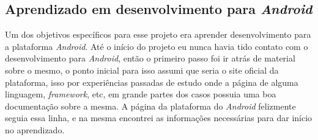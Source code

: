 \documentclass[hidelinks,12pt]{article}
\begin{document}
\subsection{Aprendizado em desenvolvimento para \textit{Android}}
Um dos objetivos espec\'ificos para esse projeto era aprender desenvolvimento para a plataforma \textit{Android}. At\'e o in\'icio do projeto eu nunca havia tido contato com o desenvolvimento para \textit{Android}, ent\~ao o primeiro passo foi ir atr\'as de material sobre o mesmo, o ponto inicial para isso assumi que seria o site oficial da plataforma, isso por experiências passadas de estudo onde a p\'agina de alguma linguagem, \textit{framework}, etc, em grande partes dos casos possuia uma boa documenta\c{c}\~ao sobre a mesma. A p\'agina da plataforma do \textit{Android} felizmente seguia essa linha, e na mesma encontrei as informa\c{c}\~oes necess\'arias para dar in\'icio no aprendizado.
\end{document}
